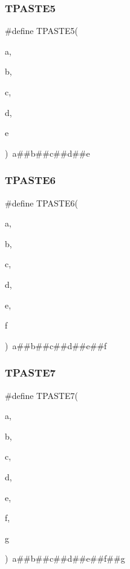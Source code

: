 \subsubsection{\texorpdfstring{TPASTE5}{TPASTE5}}
{\footnotesize\ttfamily \#define T\+P\+A\+S\+T\+E5(\begin{DoxyParamCaption}\item[{}]{a,  }\item[{}]{b,  }\item[{}]{c,  }\item[{}]{d,  }\item[{}]{e }\end{DoxyParamCaption})~a\#\#b\#\#c\#\#d\#\#e}

\mbox{\label{group__group__sam0__utils__tpaste_ga2c4dbcf9049d7553366bbf9b9bc4e801}} 
\subsubsection{\texorpdfstring{TPASTE6}{TPASTE6}}
{\footnotesize\ttfamily \#define T\+P\+A\+S\+T\+E6(\begin{DoxyParamCaption}\item[{}]{a,  }\item[{}]{b,  }\item[{}]{c,  }\item[{}]{d,  }\item[{}]{e,  }\item[{}]{f }\end{DoxyParamCaption})~a\#\#b\#\#c\#\#d\#\#e\#\#f}

\mbox{\label{group__group__sam0__utils__tpaste_gad36c0d6224338a4f8738aa25659afc14}} 
\subsubsection{\texorpdfstring{TPASTE7}{TPASTE7}}
{\footnotesize\ttfamily \#define T\+P\+A\+S\+T\+E7(\begin{DoxyParamCaption}\item[{}]{a,  }\item[{}]{b,  }\item[{}]{c,  }\item[{}]{d,  }\item[{}]{e,  }\item[{}]{f,  }\item[{}]{g }\end{DoxyParamCaption})~a\#\#b\#\#c\#\#d\#\#e\#\#f\#\#g}


